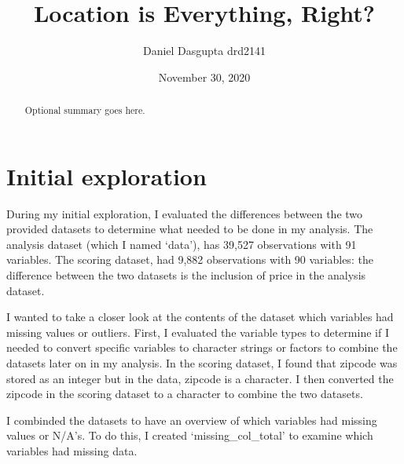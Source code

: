 \documentclass[11pt,]{article}
\title{Location is Everything, Right?}
\author{Daniel Dasgupta drd2141}
\date{November 30, 2020}
\begin{document}
\maketitle
\begin{abstract}
Optional summary goes here.
\end{abstract}

\section{Initial exploration}\label{initial-exploration}

During my initial exploration, I evaluated the differences between the
two provided datasets to determine what needed to be done in my
analysis. The analysis dataset (which I named `data'), has 39,527
observations with 91 variables. The scoring dataset, had 9,882
observations with 90 variables: the difference between the two datasets
is the inclusion of price in the analysis dataset.

I wanted to take a closer look at the contents of the dataset which
variables had missing values or outliers. First, I evaluated the
variable types to determine if I needed to convert specific variables to
character strings or factors to combine the datasets later on in my
analysis. In the scoring dataset, I found that zipcode was stored as an
integer but in the data, zipcode is a character. I then converted the
zipcode in the scoring dataset to a character to combine the two
datasets.

I combinded the datasets to have an overview of which variables had
missing values or N/A's. To do this, I created `missing\_col\_total' to
examine which variables had missing data.
\end{document}
